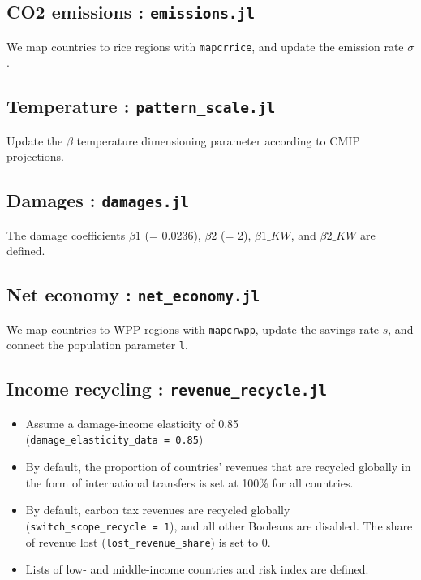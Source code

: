 \documentclass[
]{article}
\providecommand{\tightlist}{%
  \setlength{\itemsep}{0pt}\setlength{\parskip}{0pt}}
\begin{document}
\subsection{\texorpdfstring{CO2 emissions :
\texttt{emissions.jl}}{CO2 emissions : emissions.jl}}\label{co2-emissions-emissions.jl}

We map countries to rice regions with \texttt{mapcrrice}, and update the
emission rate \(\sigma\).

\subsection{\texorpdfstring{Temperature :
\texttt{pattern\_scale.jl}}{Temperature : pattern\_scale.jl}}\label{temperature-pattern_scale.jl}

Update the \(\beta\) temperature dimensioning parameter according to
CMIP projections.

\subsection{\texorpdfstring{Damages :
\texttt{damages.jl}}{Damages : damages.jl}}\label{damages-damages.jl}

The damage coefficients $\beta1$ (= 0.0236), $\beta2$ (= 2), $\beta1\_KW$, and $\beta2\_KW$ are
defined.

\subsection{\texorpdfstring{Net economy :
\texttt{net\_economy.jl}}{Net economy : net\_economy.jl}}\label{net-economy-net_economy.jl}

We map countries to WPP regions with \texttt{mapcrwpp}, update the
savings rate \(s\), and connect the population parameter \texttt{l}.

\subsection{\texorpdfstring{Income recycling :
\texttt{revenue\_recycle.jl}}{Income recycling : revenue\_recycle.jl}}\label{income-recycling-revenue_recycle.jl}

\begin{itemize}
\tightlist
\item
  Assume a damage-income elasticity of 0.85
  (\texttt{damage\_elasticity\_data\ =\ 0.85})
\item
  By default, the proportion of countries' revenues that are recycled
  globally in the form of international transfers is set at 100\% for
  all countries.
\item
  By default, carbon tax revenues are recycled globally
  (\texttt{switch\_scope\_recycle\ =\ 1}), and all other Booleans are
  disabled. The share of revenue lost (\texttt{lost\_revenue\_share}) is
  set to 0.
\item
  Lists of low- and middle-income countries and risk index are defined.
\end{itemize}
\end{document}
